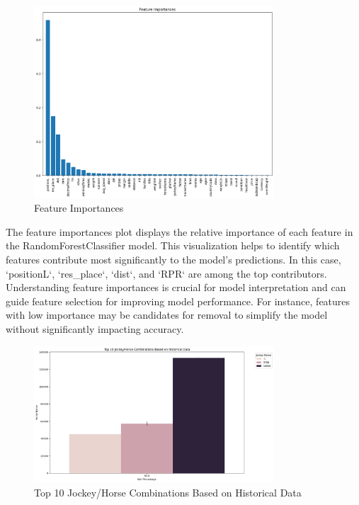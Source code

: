 \documentclass{article}
\begin{document}
\begin{figure}[H]
    \centering
    \includegraphics[width=0.8\textwidth]{images/feature_importances.png} %
    \caption{Feature Importances}
    \label{fig:feature_importances}
\end{figure}

The feature importances plot displays the relative importance of each feature in the RandomForestClassifier model. This visualization helps to identify which features contribute most significantly to the model's predictions. In this case, `positionL`, `res_place`, `dist`, and `RPR` are among the top contributors. Understanding feature importances is crucial for model interpretation and can guide feature selection for improving model performance. For instance, features with low importance may be candidates for removal to simplify the model without significantly impacting accuracy.

\begin{figure}[H]
    \centering
    \includegraphics[width=0.8\textwidth]{images/top_jockey_horse_combinations.png} %
    \caption{Top 10 Jockey/Horse Combinations Based on Historical Data}
    \label{fig:top_jockey_horse_combinations}
\end{figure}
\end{document}
